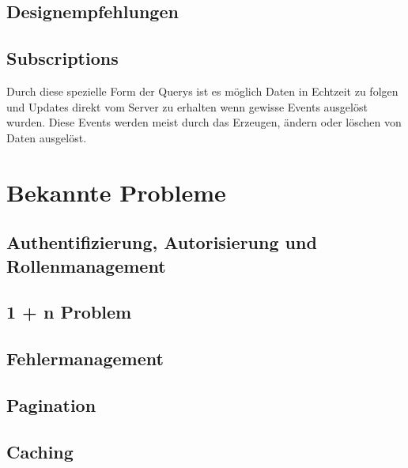 \subsection{Designempfehlungen}

\subsection{Subscriptions}
Durch diese spezielle Form der Querys ist es möglich Daten in Echtzeit zu folgen und Updates direkt vom Server zu erhalten wenn gewisse Events ausgelöst wurden.
Diese Events werden meist durch das Erzeugen, ändern oder löschen von Daten ausgelöst.

\section{Bekannte Probleme}

\subsection{Authentifizierung, Autorisierung und Rollenmanagement}

\subsection{1 + n Problem}

\subsection{Fehlermanagement}

\subsection{Pagination}

\subsection{Caching}
